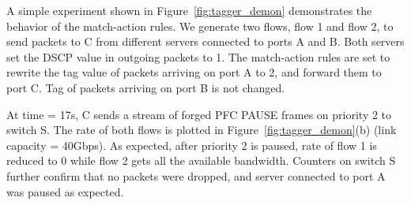   A simple experiment shown in
Figure~\ref{fig:tagger_demon} demonstrates the behavior of the match-action
rules.  We generate two flows, flow 1 and flow 2, to send packets to C from
different servers connected to ports A and B. Both servers set the DSCP value in
outgoing packets to 1. The match-action rules are set to rewrite the tag value
of packets arriving on port A to 2, and forward them to port C. Tag of packets
arriving on port B is not changed.
 
At time = 17s, C sends a stream of forged PFC PAUSE frames on priority 2 to
switch S. The rate of both flows is plotted in Figure~\ref{fig:tagger_demon}(b)
(link capacity = 40Gbps). As expected, after priority 2 is paused, rate of
flow 1 is reduced to 0 while flow 2 gets all the available bandwidth. 
Counters on switch S further confirm that no packets were dropped, and server
connected to port A was paused as expected.
